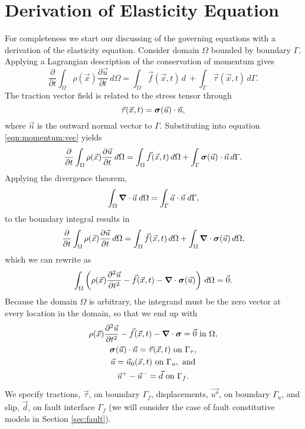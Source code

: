 \section{Derivation of Elasticity Equation}

For completeness we start our discussing of the governing equations
with a derivation of the elasticity equation. Consider domain $\Omega$
bounded by boundary $\Gamma$. Applying a Lagrangian description of the
conservation of momentum gives
\begin{equation}
\label{eqn:momentum:vec}
\frac{\partial}{\partial t}\int_{\Omega}\rho(\vec{x})\frac{\partial\vec{u}}{\partial t}\, d\Omega=\int_{\Omega}\vec{f}(\vec{x},t)\, d\ + \int_{\Gamma}\vec{\tau}(\vec{x},t)\, d\Gamma.
\end{equation}
The traction vector field is related to the stress tensor through
\begin{equation}
\vec{\tau}(\vec{x},t) = \bm{\sigma}(\vec{u}) \cdot \vec{n},
\end{equation}
where $\vec{n}$ is the outward normal vector to $\Gamma$. Substituting
into equation \vref{eqn:momentum:vec} yields
\begin{equation}
\frac{\partial}{\partial t}\int_{\Omega}\rho(\vec{x})\frac{\partial\vec{u}}{\partial t}\, d\Omega=\int_{\Omega}\vec{f}(\vec{x},t)\, d\Omega+\int_{\Gamma}\bm{\sigma}(\vec{u})\cdot\vec{n}\, d\Gamma.
\end{equation}
Applying the divergence theorem,
\begin{equation}
\int_{\Omega}\bm{\nabla}\cdot\vec{a}\: d\Omega=\int_{\Gamma}\vec{a}\cdot\vec{n}\: d\Gamma,
\end{equation}
to the boundary integral results in
\begin{equation}
\frac{\partial}{\partial t}\int_{\Omega}\rho(\vec{x})\frac{\partial\vec{u}}{\partial t}\, d\Omega=\int_{\Omega}\vec{f}(\vec{x},t)\, d\Omega+\int_{\Omega}\bm{\nabla}\cdot\bm{\sigma}(\vec{u})\, d\Omega,
\end{equation}
which we can rewrite as
\begin{equation}
\int_{\Omega}\left(\rho(\vec{x})\frac{\partial^{2}\vec{u}}{\partial t^{2}}-\vec{f}(\vec{x},t)-\bm{\nabla}\cdot\bm{\sigma}(\vec{u})\right)\, d\Omega=\vec{0}.
\end{equation}
Because the domain $\Omega$ is arbitrary, the integrand must be the zero
vector at every location in the domain, so that we end up with
\begin{gather}
\rho(\vec{x})\frac{\partial^{2}\vec{u}}{\partial t^{2}}-\vec{f}(\vec{x},t)-\bm{\nabla}\cdot\bm{\sigma}=\vec{0}\text{ in }\Omega,\\
\bm{\sigma}(\vec{u})\cdot\vec{n}=\vec{\tau}(\vec{x},t)\text{ on }\Gamma_{\tau}\text{,}\\
\vec{u}=\vec{u}_0(\vec{x},t)\text{ on }\Gamma_{u},\text{ and}\\
\vec{u}^{+}-\vec{u}^{-}=\vec{d}\text{ on }\Gamma_{f}.
\end{gather}
We specify tractions, $\vec{\tau}$, on boundary $\Gamma_{f}$, displacements,
$\vec{u^{o}}$, on boundary $\Gamma_{u}$, and slip, $\vec{d}$,
on fault interface $\Gamma_{f}$ (we will consider the case of fault constitutive
models in Section \vref{sec:fault}).
